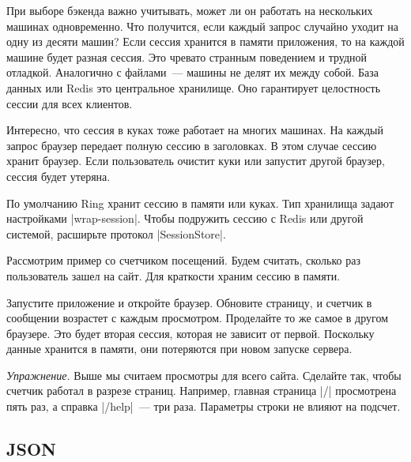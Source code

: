 При выборе бэкенда важно учитывать, может ли он работать на нескольких машинах
одновременно. Что получится, если каждый запрос случайно уходит на одну из
десяти машин? Если сессия хранится в памяти приложения, то на каждой машине
будет разная сессия. Это чревато странным поведением и трудной
отладкой. Аналогично с файлами~--- машины не делят их между собой. База данных
или Redis это центральное хранилище. Оно гарантирует целостность сессии для всех
клиентов.

Интересно, что сессия в куках тоже работает на многих машинах. На каждый запрос
браузер передает полную сессию в заголовках. В этом случае сессию хранит
браузер. Если пользователь очистит куки или запустит другой браузер, сессия
будет утеряна.

По умолчанию Ring хранит сессию в памяти или куках. Тип хранилища задают
настройками \spverb|wrap-session|. Чтобы подружить сессию с Redis или другой
системой, расширьте протокол \spverb|SessionStore|.

Рассмотрим пример со счетчиком посещений. Будем считать, сколько раз
пользователь зашел на сайт. Для краткости храним сессию в памяти.

\begin{english}
\end{english}

Запустите приложение и откройте браузер. Обновите страницу, и счетчик в
сообщении возрастет с каждым просмотром. Проделайте то же самое в другом
браузере. Это будет вторая сессия, которая не зависит от первой. Поскольку
данные хранится в памяти, они потеряются при новом запуске сервера.

\emph{Упражнение.} Выше мы считаем просмотры для всего сайта. Сделайте так,
чтобы счетчик работал в разрезе страниц. Например, главная страница \spverb|/|
просмотрена пять раз, а справка \spverb|/help|~--- три раза. Параметры строки не
влияют на подсчет.

\subsection{JSON}

